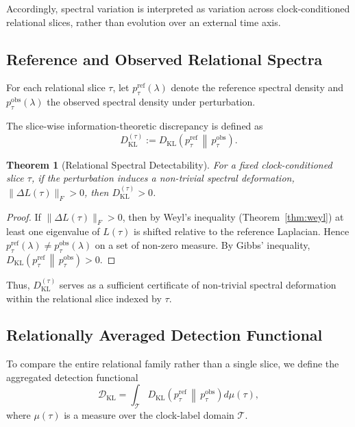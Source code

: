 \documentclass[11pt,a4paper]{article}
\newtheorem{theorem}{Theorem}[section]
\theoremstyle{definition}
\theoremstyle{remark}
\begin{document}
Accordingly, spectral variation is interpreted as variation across clock-conditioned relational
slices, rather than evolution over an external time axis.

\subsection{Reference and Observed Relational Spectra}

For each relational slice $\tau$, let $p_{\tau}^{\mathrm{ref}}(\lambda)$ denote the reference
spectral density and $p_{\tau}^{\mathrm{obs}}(\lambda)$ the observed spectral density under
perturbation.

The slice-wise information-theoretic discrepancy is defined as
\begin{equation}
  D_{\mathrm{KL}}^{(\tau)}
    := D_{\mathrm{KL}}
       \!\left(p_{\tau}^{\mathrm{ref}} \,\middle\|\, p_{\tau}^{\mathrm{obs}}\right).
\end{equation}

\begin{theorem}[Relational Spectral Detectability]
For a fixed clock-conditioned slice $\tau$, if the perturbation induces a non-trivial spectral
deformation, $\|\Delta L(\tau)\|_F > 0$, then $D_{\mathrm{KL}}^{(\tau)} > 0$.
\end{theorem}

\begin{proof}
If $\|\Delta L(\tau)\|_F > 0$, then by Weyl's inequality (Theorem~\ref{thm:weyl}) at least one
eigenvalue of $L(\tau)$ is shifted relative to the reference Laplacian.  Hence
$p_{\tau}^{\mathrm{ref}}(\lambda) \neq p_{\tau}^{\mathrm{obs}}(\lambda)$ on a set of non-zero
measure.  By Gibbs' inequality,
$D_{\mathrm{KL}}\!\left(p_{\tau}^{\mathrm{ref}} \,\middle\|\, p_{\tau}^{\mathrm{obs}}\right)>0$.
\end{proof}

Thus, $D_{\mathrm{KL}}^{(\tau)}$ serves as a sufficient certificate of non-trivial spectral
deformation within the relational slice indexed by $\tau$.

\subsection{Relationally Averaged Detection Functional}

To compare the entire relational family rather than a single slice, we define the aggregated
detection functional
\begin{equation}
  \mathcal{D}_{\mathrm{KL}}
    = \int_{\mathcal{T}}
      D_{\mathrm{KL}}\!\left(p_{\tau}^{\mathrm{ref}} \,\middle\|\, p_{\tau}^{\mathrm{obs}}\right)
      d\mu(\tau),
\end{equation}
where $\mu(\tau)$ is a measure over the clock-label domain $\mathcal{T}$.
\end{document}
